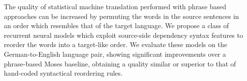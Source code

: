 The quality of statistical machine translation performed with phrase based approaches can be increased by permuting the words in the source sentences in an order which resembles that of the target language. We propose a class of recurrent neural models which exploit source-side dependency syntax features to reorder the words into a target-like order. We evaluate these models on the German-to-English language pair, showing significant improvements over a phrase-based Moses baseline, obtaining a quality similar or superior to that of hand-coded syntactical reordering rules.
